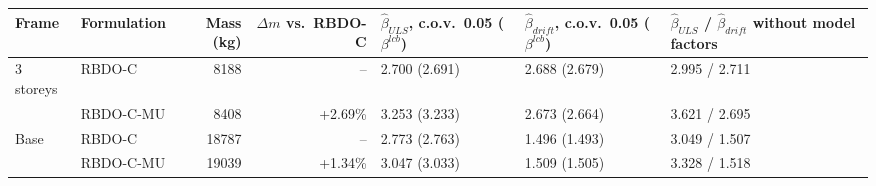 \begin{tabular}{llrrlll}
\toprule
Frame & Formulation & Mass (kg) & $\Delta m$ vs.\ RBDO-C & $\hat\beta_{ULS}$, c.o.v.\ 0.05 ($\beta^{lcb}$) & $\hat\beta_{drift}$, c.o.v.\ 0.05 ($\beta^{lcb}$) & $\hat\beta_{ULS}$ / $\hat\beta_{drift}$ without model factors \\
\midrule
3 storeys & RBDO-C & 8188 & -- & 2.700 (2.691) & 2.688 (2.679) & 2.995 / 2.711 \\
 & RBDO-C-MU & 8408 & +2.69\% & 3.253 (3.233) & 2.673 (2.664) & 3.621 / 2.695 \\
\midrule
Base & RBDO-C & 18787 & -- & 2.773 (2.763) & 1.496 (1.493) & 3.049 / 1.507 \\
 & RBDO-C-MU & 19039 & +1.34\% & 3.047 (3.033) & 1.509 (1.505) & 3.328 / 1.518 \\
\bottomrule
\end{tabular}